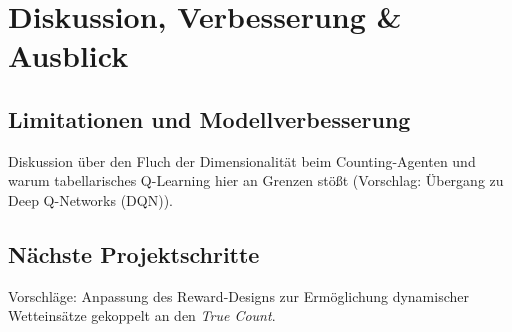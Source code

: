 
\section{Diskussion, Verbesserung \& Ausblick}
\label{sec:diskussion}

\subsection{Limitationen und Modellverbesserung}
Diskussion über den Fluch der Dimensionalität beim Counting-Agenten und warum tabellarisches Q-Learning hier an Grenzen stößt (Vorschlag: Übergang zu Deep Q-Networks (DQN)).

\subsection{Nächste Projektschritte}
Vorschläge: Anpassung des Reward-Designs zur Ermöglichung dynamischer Wetteinsätze gekoppelt an den \textit{True Count}.

